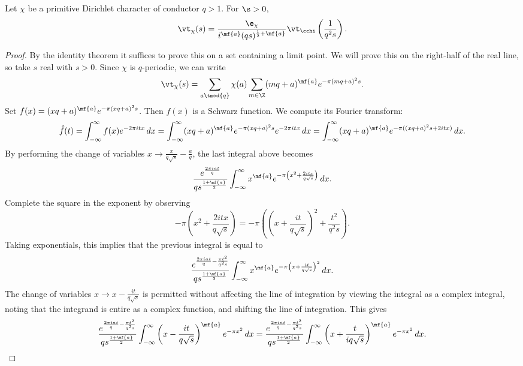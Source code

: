       \begin{theorem}
        Let $\chi$ be a primitive Dirichlet character of conductor $q > 1$. For $\s > 0$,
        \[
          \vt_{\chi}(s) = \frac{\e_{\chi}}{i^{\mf{a}}(qs)^{\frac{1}{2}+\mf{a}}}\vt_{\cchi}\left(\frac{1}{q^{2}s}\right).
        \]
      \end{theorem}
      \begin{proof}
        By the identity theorem it suffices to prove this on a set containing a limit point. We will prove this on the right-half of the real line, so take $s$ real with $s > 0$. Since $\chi$ is $q$-periodic, we can write
        \[
          \vt_{\chi}(s) = \sum_{a \tmod{q}}\chi(a)\sum_{m \in \Z}(mq+a)^{\mf{a}}e^{-\pi(mq+a)^{2}s}.
        \]
        Set $f(x) = (xq+a)^{\mf{a}}e^{-\pi(xq+a)^{2}s}$. Then $f(x)$ is a Schwarz function. We compute its Fourier transform:
        \[
          \hat{f}(t) = \int_{-\infty}^{\infty}f(x)e^{-2\pi itx}\,dx = \int_{-\infty}^{\infty}(xq+a)^{\mf{a}}e^{-\pi(xq+a)^{2}s}e^{-2\pi itx}\,dx = \int_{-\infty}^{\infty}(xq+a)^{\mf{a}}e^{-\pi((xq+a)^{2}s+2itx)}\,dx.
        \]
        By performing the change of variables $x \to \frac{x}{q\sqrt{s}}-\frac{a}{q}$, the last integral above becomes
        \[
          \frac{e^{\frac{2\pi iat}{q}}}{qs^{\frac{1+\mf{a}}{2}}}\int_{-\infty}^{\infty}x^{\mf{a}}e^{-\pi\left(x^{2}+\frac{2itx}{q\sqrt{s}}\right)}\,dx.
        \]
        Complete the square in the exponent by observing
        \[
          -\pi\left(x^{2}+\frac{2itx}{q\sqrt{s}}\right) = -\pi\left(\left(x+\frac{it}{q\sqrt{s}}\right)^{2}+\frac{t^{2}}{q^{2}s}\right).
        \]
        Taking exponentials, this implies that the previous integral is equal to
        \[
          \frac{e^{\frac{2\pi iat}{q}-\frac{\pi t^{2}}{q^{2}s}}}{qs^{\frac{1+\mf{a}}{2}}}\int_{-\infty}^{\infty}x^{\mf{a}}e^{-\pi\left(x+\frac{it}{q\sqrt{s}}\right)^{2}}\,dx.
        \]
        The change of variables $x \to x-\frac{it}{q\sqrt{s}}$ is permitted without affecting the line of integration by viewing the integral as a complex integral, noting that the integrand is entire as a complex function, and shifting the line of integration. This gives
        \[
          \frac{e^{\frac{2\pi iat}{q}-\frac{\pi t^{2}}{q^{2}s}}}{qs^{\frac{1+\mf{a}}{2}}}\int_{-\infty}^{\infty}\left(x-\frac{it}{q\sqrt{s}}\right)^{\mf{a}}e^{-\pi x^{2}}\,dx = \frac{e^{\frac{2\pi iat}{q}-\frac{\pi t^{2}}{q^{2}s}}}{qs^{\frac{1+\mf{a}}{2}}}\int_{-\infty}^{\infty}\left(x+\frac{t}{iq\sqrt{s}}\right)^{\mf{a}}e^{-\pi x^{2}}\,dx.
        \]

\end{proof}
